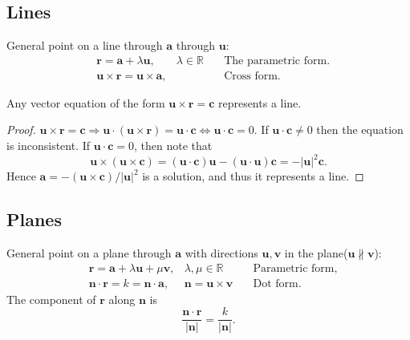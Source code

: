 \documentclass[10pt]{article}
\begin{document}
    \subsection{Lines}
    General point on a line through $ \mathbf{a} $ through $ \mathbf{u} $:
    \[
        \begin{aligned}
            &\mathbf{r} = \mathbf{a}+\lambda\mathbf{u}, &\lambda\in \mathbb{R}\quad &\text{The parametric form.}\\
            &\mathbf{u} \times \mathbf{r} = \mathbf{u} \times \mathbf{a},&  &\text{Cross form.}
        \end{aligned}
    \]
    \begin{proposition}\label{prop:line_equation_vec}
        Any vector equation of the form $ \mathbf{u}\times \mathbf{r}=\mathbf{c} $ represents a line.
    \end{proposition}
    \begin{proof}
        $ \mathbf{u}\times \mathbf{r}=\mathbf{c} \Rightarrow \mathbf{u}\cdot (\mathbf{u}\times \mathbf{r})=\mathbf{u}\cdot \mathbf{c} \Leftrightarrow \mathbf{u} \cdot \mathbf{c}=0 $. If $ \mathbf{u} \cdot \mathbf{c}\neq 0 $ then the equation is inconsistent. If $ \mathbf{u}\cdot \mathbf{c} =0$, then note that 
        \[
            \mathbf{u} \times (\mathbf{u} \times \mathbf{c})=(\mathbf{u}\cdot \mathbf{c})\mathbf{u}-(\mathbf{u}\cdot \mathbf{u})\mathbf{c} = -\left| \mathbf{u} \right|^2 \mathbf{c}
        .\]
        Hence $ \mathbf{a} = -(\mathbf{u} \times \mathbf{c})/|\mathbf{u}|^2 $ is a solution, and thus it represents a line.
    \end{proof}
    \subsection{Planes}
    General point on a plane through $ \mathbf{a} $ with directions $ \mathbf{u},\mathbf{v} $ in the plane($ \mathbf{u}\nparallel \mathbf{v} $):
    \[
        \begin{aligned}
             &\mathbf{r} = \mathbf{a}+\lambda \mathbf{u}+\mu \mathbf{v}, &\lambda, \mu\in \mathbb{R} &\quad \text{Parametric form,}\\
             & \mathbf{n} \cdot \mathbf{r} = k = \mathbf{n} \cdot \mathbf{a}, & \mathbf{n} = \mathbf{u}\times \mathbf{v} &\quad \text{Dot form.}
        \end{aligned}
    \]
    The component of $\mathbf{r}$ along $ \mathbf{n} $ is 
    \[
        \frac{\mathbf{n}\cdot \mathbf{r}}{|\mathbf{n}|}=\frac{k}{|\mathbf{n}|}
    .\]
\end{document}
